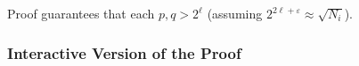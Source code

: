 \documentclass[11pt]{article}
\newcommand{\jnote}[1]{{\textcolor{blue}{Jon's note: #1}}}
\newcommand{\nnote}[1]{{\textcolor{purple}{Mikito: #1}}}
\newcommand{\?}[1]{\stackrel{?}{#1}}
\begin{document}
Proof guarantees that each $p, q > 2^\ell$ (assuming $2^{2 \ell + \varepsilon} \approx \sqrt{N_i}$).



\subsubsection{Interactive Version of the Proof}
\end{document}
